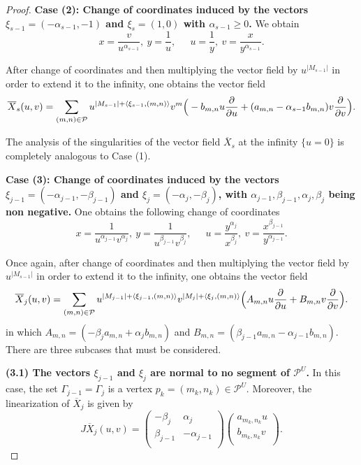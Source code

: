 \documentclass[12pt]{amsart}
\begin{document}
\begin{proof}
\textbf{Case (2): Change of coordinates induced by the vectors $\xi_{s-1} = (-\alpha_{s-1},-1)$ and $\xi_{s} = (1,0)$ with $\alpha_{s-1} \geq 0$.} We obtain
$$x = \frac{v}{u^{\alpha_{s-1}}}, \ y = \frac{1}{u}, \ \quad \ u = \frac{1}{y}, \ v = \frac{x}{y^{\alpha_{s-1}}}.$$

After change of coordinates and then multiplying the vector field by $u^{|M_{s-1}|}$ in order to extend it to the infinity, one obtains the vector field
\begin{equation}
\overline{X}_{s}(u,v) = \sum_{(m,n)\in\mathcal{P}} u^{|M_{s-1}| + \langle\xi_{s-1},(m,n)\rangle}v^{m}\Big{(}-b_{m,n}u\frac{\partial}{\partial u} + (a_{m,n}-\alpha_{s-1}b_{m,n})v\frac{\partial}{\partial v}\Big{)}.
\end{equation}

The analysis of the singularities of the vector field $\overline{X}_{s}$ at the infinity $\{u = 0\}$ is completely analogous to Case (1).

\textbf{Case (3): Change of coordinates induced by the vectors $\xi_{j-1} = (-\alpha_{j-1},-\beta_{j-1})$ and $\xi_{j} = (-\alpha_{j},-\beta_{j})$, with $\alpha_{j-1},\beta_{j-1},\alpha_{j},\beta_{j}$ being non negative.} One obtains the following change of coordinates
$$x = \frac{1}{u^{\alpha_{j-1}}v^{\alpha_{j}}}, \ y = \frac{1}{u^{\beta_{j-1}}v^{\beta_{j}}}, \ \quad \ u = \frac{y^{\alpha_{j}}}{x^{\beta_{j}}}, \ v = \frac{x^{\beta_{j-1}}}{y^{\alpha_{j-1}}}.$$


Once again, after change of coordinates and then multiplying the vector field by $u^{|M_{s-1}|}$ in order to extend it to the infinity, one obtains the vector field
\begin{equation}
\overline{X}_{j}(u,v) = \sum_{(m,n)\in\mathcal{P}} u^{|M_{j-1}| + \langle\xi_{j-1},(m,n)\rangle}v^{|M_{j}| + \langle\xi_{j},(m,n)\rangle}\Big{(}A_{m,n}u\frac{\partial}{\partial u} + B_{m,n}v\frac{\partial}{\partial v}\Big{)}.
\end{equation}
in which $A_{m,n} = (-\beta_{j}a_{m,n} + \alpha_{j}b_{m,n})$ and $B_{m,n} = (\beta_{j-1}a_{m,n}-\alpha_{j-1}b_{m,n})$. There are three subcases that must be considered.

\textbf{(3.1) The vectors $\xi_{j-1}$ and $\xi_{j}$ are normal to no segment of $\mathcal{P}^{U}$.} In this case, the set $\Gamma_{j-1} = \Gamma_{j}$ is a vertex $p_{k} = (m_{k},n_{k})\in\mathcal{P}^{U}$. Moreover, the linearization of $\overline{X}_{j}$ is given by
$$
J\overline{X}_{j}(u,v) = \left(
  \begin{array}{cc}
    -\beta_{j} & \alpha_{j} \\
    \beta_{j-1} & -\alpha_{j-1} \\
  \end{array}
\right)\left(
  \begin{array}{c}
    a_{m_{k},n_{k}}u  \\
    b_{m_{k},n_{k}}v  \\
  \end{array}
\right). 
$$


\end{proof}
\end{document}
